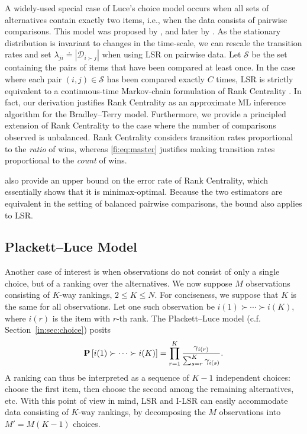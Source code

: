 A widely-used special case of Luce's choice model occurs when all sets of alternatives contain exactly two items, i.e., when the data consists of pairwise comparisons.
This model was proposed by \citet{zermelo1928berechnung}, and later by \citet{bradley1952rank}.
As the stationary distribution is invariant to changes in the time-scale, we can rescale the transition rates and set $\lambda_{ji} \doteq |\mathcal{D}_{i \succ j}|$ when using LSR on pairwise data.
Let $\mathcal{S}$ be the set containing the pairs of items that have been compared at least once.
In the case where each pair $(i, j) \in \mathcal{S}$ has been compared exactly $C$ times, LSR is strictly equivalent to a continuous-time Markov-chain formulation of Rank Centrality \citep{negahban2012iterative}.
In fact, our derivation justifies Rank Centrality as an approximate ML inference algorithm for the Bradley--Terry model.
Furthermore, we provide a principled extension of Rank Centrality to the case where the number of comparisons observed is unbalanced.
Rank Centrality considers transition rates proportional to the \emph{ratio} of wins, whereas \eqref{fi:eq:master} justifies making transition rates proportional to the \emph{count} of wins.

\citet{negahban2012iterative} also provide an upper bound on the error rate of Rank Centrality, which essentially shows that it is minimax-optimal.
Because the two estimators are equivalent in the setting of balanced pairwise comparisons, the bound also applies to LSR.

\subsection{Plackett--Luce Model}
\label{fi:sec:partial}

Another case of interest is when observations do not consist of only a single choice, but of a ranking over the alternatives.
We now suppose $M$ observations consisting of $K$-way rankings, $2 \le K \le N$.
For conciseness, we suppose that $K$ is the same for all observations.
Let one such observation be $i(1) \succ \cdots \succ i(K)$, where $i(r)$ is the item with $r$-th rank.
The Plackett--Luce model (c.f. Section~\ref{in:sec:choice}) posits
\begin{align*}
\mathbf{P}\left[  i(1) \succ \cdots \succ i(K)  \right]
  = \prod_{r = 1}^{K} \frac{\gamma_{i(r)}}{\sum_{s = r}^{K} \gamma_{i(s)}}.
\end{align*}
A ranking can thus be interpreted as a sequence of $K-1$ independent choices:
choose the first item, then choose the second among the remaining alternatives, etc.
With this point of view in mind, LSR and I-LSR can easily accommodate data consisting of $K$-way rankings, by decomposing the $M$ observations into $M' = M (K - 1)$ choices.

